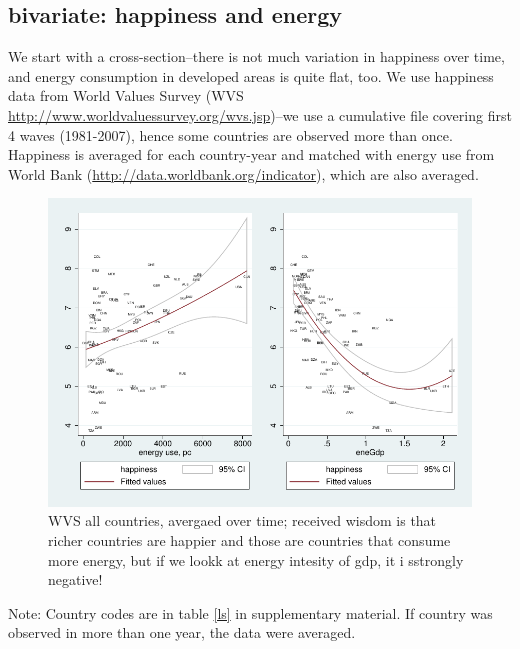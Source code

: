 \documentclass[10pt, letterpaper]{article}
\begin{document}
\begin{spacing}{1.4}

\subsection{bivariate: happiness and energy}

We start with a cross-section--there is not much variation in happiness over
time, and energy consumption in developed areas is quite flat, too. 
We use happiness data from World Values Survey
(WVS \url{http://www.worldvaluessurvey.org/wvs.jsp})--we use a cumulative file
covering first 4 waves (1981-2007), hence some countries are observed more than
once. Happiness is averaged for each country-year and matched with energy use
 from World Bank (\url{http://data.worldbank.org/indicator}), which are also averaged. 

\begin{figure}[H]
 \includegraphics[width=6in]{graphsAndTables/couWvsLsEnePerGdp2.pdf}\centering
 \caption{WVS all countries, avergaed over time;  received wisdom is that richer countries are happier and those are countries that consume more energy, but if we lookk at energy intesity of gdp, it i sstrongly negative! }\label{couWvsLsEnePerGdp2.pdf}
\end{figure}
{\scriptsize Note: Country codes are in table \ref{ls} in supplementary
  material. If country was observed in more than one year, the data were averaged.}



\end{spacing}
\end{document}
